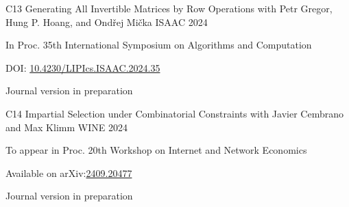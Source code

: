 \begin{cvpublication}
	{C13}
	{Generating All Invertible Matrices by Row Operations}
	{with Petr Gregor, Hung P. Hoang, and Ondřej Mička}
	{ISAAC}
	{2024}
    {
	\begin{cvitems}
	\item In Proc. 35th International Symposium on Algorithms and Computation
	\item[] DOI: \href{https://doi.org/10.4230/LIPIcs.ISAAC.2024.35}{10.4230/LIPIcs.ISAAC.2024.35}
	\item Journal version in preparation
	\end{cvitems}
	}
\end{cvpublication}
\begin{cvpublication}
	{C14}
	{Impartial Selection under Combinatorial Constraints}
	{with Javier Cembrano and Max Klimm}
	{WINE}
	{2024}
    {
	\begin{cvitems}
	\item To appear in Proc. 20th Workshop on Internet and Network Economics
	\item[] Available on arXiv:\href{https://arxiv.org/abs/2409.20477}{2409.20477}
	\item Journal version in preparation
	\end{cvitems}
	}
\end{cvpublication}

\vspace{{1 mm}}

